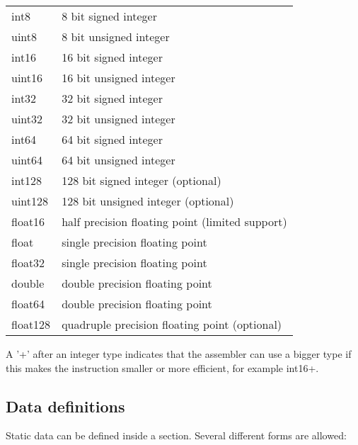 \documentclass[forwardcom.tex]{subfiles}
\begin{document}
\begin{tabular}{|p{15mm}p{125mm}|}
\hline
int8    & 8 bit signed integer\\
uint8   & 8 bit unsigned integer\\
int16   & 16 bit signed integer\\
uint16  & 16 bit unsigned integer\\
int32   & 32 bit signed integer\\
uint32  & 32 bit unsigned integer\\
int64   & 64 bit signed integer\\
uint64  & 64 bit unsigned integer\\
int128  & 128 bit signed integer (optional)\\
uint128 & 128 bit unsigned integer (optional)\\
float16 & half precision floating point (limited support)\\
float   & single precision floating point\\
float32 & single precision floating point\\
double  & double precision floating point\\
float64 & double precision floating point\\
float128 & quadruple precision floating point (optional)\\
\hline
\end{tabular}
\vspace{2mm}

A '+' after an integer type indicates that the assembler can use a bigger type if this makes
the instruction smaller or more efficient, for example int16+.
\vspace{2mm}


\subsection{Data definitions} \label{assemblyDataDefinitions}
Static data can be defined inside a section. Several different forms are allowed:
\vspace{2mm}
\end{document}
